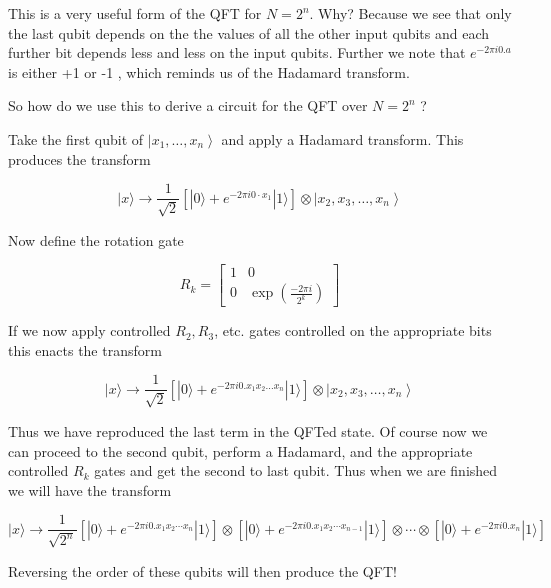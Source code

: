 \documentclass[10pt]{article}
\begin{document}
This is a very useful form of the QFT for $N=2^{n}$. Why? Because we see that only the last qubit depends on the the values of all the other input qubits and each further bit depends less and less on the input qubits. Further we note that $e^{-2 \pi i 0 . a}$ is either +1 or -1 , which reminds us of the Hadamard transform.

So how do we use this to derive a circuit for the QFT over $N=2^{n}$ ?

Take the first qubit of $\left|x_{1}, \ldots, x_{n}\right\rangle$ and apply a Hadamard transform. This produces the transform


\begin{equation*}
|x\rangle \rightarrow \frac{1}{\sqrt{2}}\left[|0\rangle+e^{-2 \pi i 0 \cdot x_{1}}|1\rangle\right] \otimes\left|x_{2}, x_{3}, \ldots, x_{n}\right\rangle \tag{29}
\end{equation*}


Now define the rotation gate

\[
R_{k}=\left[\begin{array}{cc}
1 & 0  \tag{30}\\
0 & \exp \left(\frac{-2 \pi i}{2^{k}}\right)
\end{array}\right]
\]

If we now apply controlled $R_{2}, R_{3}$, etc. gates controlled on the appropriate bits this enacts the transform


\begin{equation*}
|x\rangle \rightarrow \frac{1}{\sqrt{2}}\left[|0\rangle+e^{-2 \pi i 0 . x_{1} x_{2} \ldots x_{n}}|1\rangle\right] \otimes\left|x_{2}, x_{3}, \ldots, x_{n}\right\rangle \tag{31}
\end{equation*}


Thus we have reproduced the last term in the QFTed state. Of course now we can proceed to the second qubit, perform a Hadamard, and the appropriate controlled $R_{k}$ gates and get the second to last qubit. Thus when we are finished we will have the transform


\begin{equation*}
|x\rangle \rightarrow \frac{1}{\sqrt{2^{n}}}\left[|0\rangle+e^{-2 \pi i 0 . x_{1} x_{2} \cdots x_{n}}|1\rangle\right] \otimes\left[|0\rangle+e^{-2 \pi i 0 . x_{1} x_{2} \cdots x_{n-1}}|1\rangle\right] \otimes \cdots \otimes\left[|0\rangle+e^{-2 \pi i 0 . x_{n}}|1\rangle\right] \tag{32}
\end{equation*}


Reversing the order of these qubits will then produce the QFT!
\end{document}
